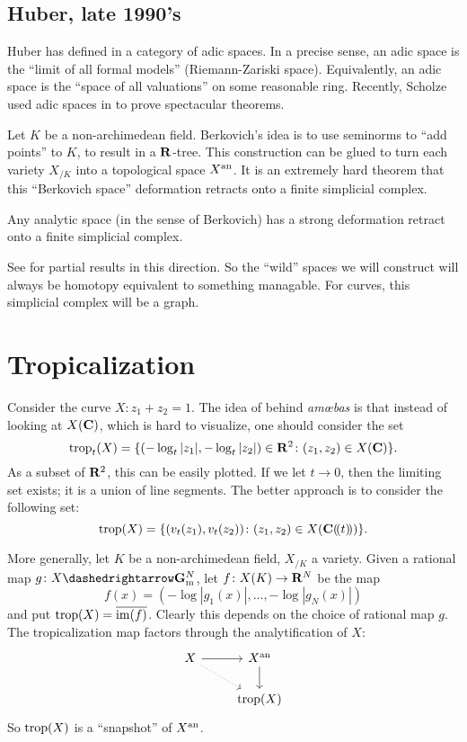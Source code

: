 \subsection{Huber, late 1990's}
Huber has defined in \cite{huber-1996} a category of adic spaces. In a 
precise sense, an adic 
space is the ``limit of all formal models'' (Riemann-Zariski space). 
Equivalently, an adic space is the ``space of all valuations'' on some 
reasonable ring. Recently, Scholze used adic spaces in \cite{scholze-2012} to prove 
spectacular theorems. 


Let $K$ be a non-archimedean field. Berkovich's idea is to use seminorms 
to ``add points'' to $K$, to result in a $\mathbf{R}$-tree. This construction 
can be glued to turn each variety $X_{/K}$ into a topological space 
$X^{\mathrm{an}}$. It is an extremely 
hard theorem that this ``Berkovich space'' deformation retracts onto a 
finite simplicial complex. 

\begin{theorem_}
Any analytic space (in the sense of Berkovich) has a strong deformation retract 
onto a finite simplicial complex. 
\end{theorem_}

See \cite{berkovich-1999,thuillier-2007} for partial results in this direction. 
So the ``wild'' spaces we will construct will always be homotopy equivalent to 
something managable. For curves, this simplicial complex will be a graph. 





\section{Tropicalization}

Consider the curve $X\colon z_1+z_2=1$. The idea of behind \emph{am\oe{}bas} is that 
instead of looking at $X(\mathbf{C})$, which is hard to visualize, one should consider the 
set 
\[
  \operatorname{trop}_t(X) = \{(-\log_t|z_1|,-\log_t|z_2|)\in \mathbf{R}^2\colon (z_1,z_2)\in X(\mathbf{C})\} .
\]
As a subset of $\mathbf{R}^2$, this can be easily plotted. If we let $t\to 0$, then 
the limiting set exists; it is a union of line segments. The better approach is 
to consider the following set: 
\[
  \operatorname{trop}(X)=\{(v_t(z_1),v_t(z_2))\colon (z_1,z_2)\in X(\mathbf{C}(\!( t)\!))\} .
\]

More generally, let $K$ be a non-archimedean field, $X_{/K}$ a variety. 
Given a rational map $g\colon X\dashedrightarrow \Gm^N$, let 
$f\colon X(K)\to \mathbf{R}^N$ be the map 
\[
  f(x) = (-\log|g_1(x)|,\dots,-\log|g_N(x)|) 
\]
and put $\operatorname{trop}(X) = \overline{\operatorname{im}(f)}$. Clearly this depends on the choice 
of rational map $g$. The tropicalization map factors through the 
analytification of $X$: 
\[
\begin{tikzcd}
  X \ar[r] \ar[dr, dotted]
    & X^\an \ar[d] \\
  & \trop(X)
\end{tikzcd}
\]
So $\operatorname{trop}(X)$ is a ``snapshot'' of $X^{\mathrm{an}}$. 

